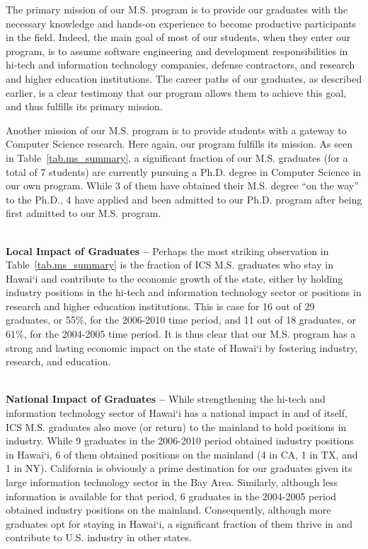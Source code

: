 \documentclass[12pt]{article}
\begin{document}
The primary mission of our M.S. program is to provide our graduates
with the necessary knowledge and hands-on experience to
become productive participants in the field. Indeed,
the main goal of most of our students, when they enter our program, is
to assume software engineering and development responsibilities in
hi-tech and information technology companies, defense contractors, and
research and higher education institutions.  The career paths of our
graduates, as described earlier, is a clear testimony that our program
allows them to achieve this goal, and thus fulfills its primary mission.

Another mission of our M.S. program is to provide students with a
gateway to Computer Science research. Here again, our program
fulfills its mission.  As seen in Table~\ref{tab.ms_summary}, a
significant fraction of our M.S. graduates (for a total of 7 students) are currently pursuing a
Ph.D. degree in Computer Science in our own program. While 
3 of them have obtained their M.S. degree ``on the way'' to the Ph.D., 
4 have applied and been admitted to our Ph.D. program after being first admitted to our
M.S. program.

~\\
\noindent
{\bf Local Impact of Graduates --} Perhaps the most striking
observation in Table~\ref{tab.ms_summary} is the fraction of ICS M.S.
graduates who stay in Hawai`i and contribute to the economic growth of the
state, either by holding industry positions in the hi-tech and
information technology sector or positions in research and higher
education institutions. This is case for 16 out of 29 graduates, or
55\%, for the 2006-2010 time period, and 11 out of 18 graduates, or
61\%, for the 2004-2005 time period. It is thus clear that our M.S.
program has a strong and lasting economic impact on the state of Hawai`i by
fostering industry, research, and education.

~\\
\noindent
{\bf National Impact of Graduates --} While strengthening the hi-tech
and information technology sector of Hawai`i has a national impact in
and of itself, ICS M.S. graduates also move (or return) to the
mainland to hold positions in industry. While 9 graduates in the
2006-2010 period obtained industry positions in Hawai`i, 6 of them
obtained positions on the mainland (4 in CA, 1 in TX, and 1 in NY).
California is obviously a prime destination for our graduates given
its large information technology sector in the Bay Area.  Similarly,
although less information is available for that period, 6 graduates in the 2004-2005
period obtained industry positions on the mainland. Consequently,
although more graduates opt for staying in Hawai`i, a significant
fraction of them thrive in and contribute to U.S. industry in other
states.
\end{document}
